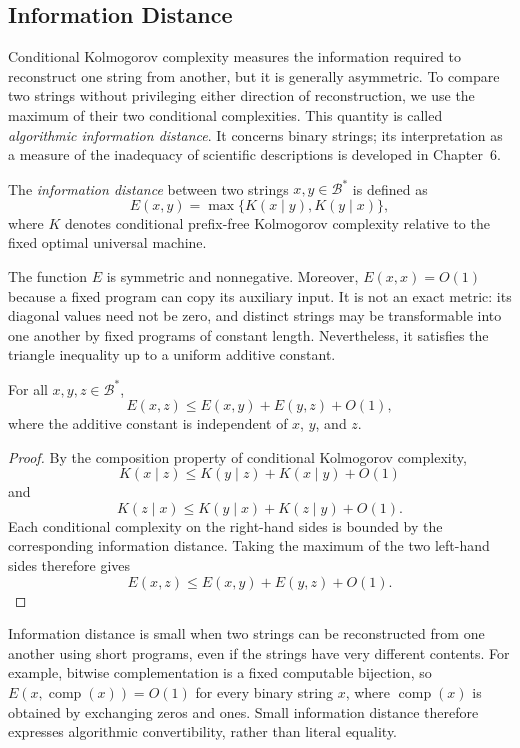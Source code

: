 \subsection*{Information Distance}
\label{sec:information_distance}

Conditional Kolmogorov complexity measures the information required to reconstruct one string from another, but it is generally asymmetric. To compare two strings without privileging either direction of reconstruction, we use the maximum of their two conditional complexities. This quantity is called \emph{algorithmic information distance}. It concerns binary strings; its interpretation as a measure of the inadequacy of scientific descriptions is developed in Chapter~6.

\begin{definition}
\label{def:information-distance}
The \emph{information distance} between two strings $x,y\in\mathcal{B}^*$ is defined as
\[
E(x,y)=\max\{K(x\mid y),K(y\mid x)\},
\]
where $K$ denotes conditional prefix-free Kolmogorov complexity relative to the fixed optimal universal machine.
\end{definition}

The function $E$ is symmetric and nonnegative. Moreover, $E(x,x)=O(1)$ because a fixed program can copy its auxiliary input. It is not an exact metric: its diagonal values need not be zero, and distinct strings may be transformable into one another by fixed programs of constant length. Nevertheless, it satisfies the triangle inequality up to a uniform additive constant.

\begin{proposition}
\label{prop:information-distance-triangle}
For all $x,y,z\in\mathcal{B}^*$,
\[
E(x,z)\leq E(x,y)+E(y,z)+O(1),
\]
where the additive constant is independent of $x$, $y$, and $z$.
\end{proposition}
\begin{proof}
By the composition property of conditional Kolmogorov complexity,
\[
K(x\mid z)\leq K(y\mid z)+K(x\mid y)+O(1)
\]
and
\[
K(z\mid x)\leq K(y\mid x)+K(z\mid y)+O(1).
\]
Each conditional complexity on the right-hand sides is bounded by the corresponding information distance. Taking the maximum of the two left-hand sides therefore gives
\[
E(x,z)\leq E(x,y)+E(y,z)+O(1).
\]
\end{proof}

Information distance is small when two strings can be reconstructed from one another using short programs, even if the strings have very different contents. For example, bitwise complementation is a fixed computable bijection, so $E(x,\operatorname{comp}(x))=O(1)$ for every binary string $x$, where $\operatorname{comp}(x)$ is obtained by exchanging zeros and ones. Small information distance therefore expresses algorithmic convertibility, rather than literal equality.

